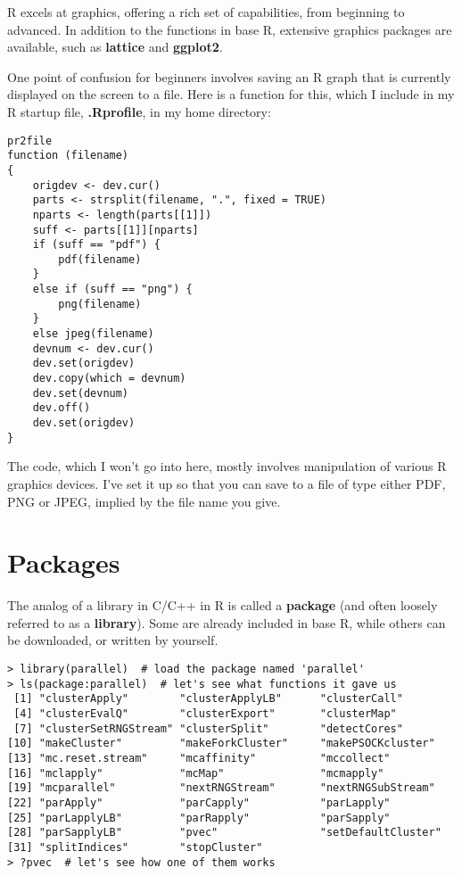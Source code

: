 R excels at graphics, offering a rich set of capabilities, from
beginning to advanced.  In addition to the functions in base R,
extensive graphics packages are available, such as {\bf lattice} and
{\bf ggplot2}.

One point of confusion for beginners involves saving an R graph that
is currently displayed on the screen to a file.  Here is a function for
this, which I include in my R startup file, {\bf .Rprofile}, in my home
directory:

\begin{lstlisting}
pr2file
function (filename) 
{
    origdev <- dev.cur()
    parts <- strsplit(filename, ".", fixed = TRUE)
    nparts <- length(parts[[1]])
    suff <- parts[[1]][nparts]
    if (suff == "pdf") {
        pdf(filename)
    }
    else if (suff == "png") {
        png(filename)
    }
    else jpeg(filename)
    devnum <- dev.cur()
    dev.set(origdev)
    dev.copy(which = devnum)
    dev.set(devnum)
    dev.off()
    dev.set(origdev)
}
\end{lstlisting}

The code, which I won't go into here, mostly involves manipulation of
various R graphics devices.  I've set it up so that you can save to a
file of type either PDF, PNG or JPEG, implied by the file name you give.

\section{Packages}

The analog of a library in C/C++ in R is called a {\bf package} (and
often loosely referred to as a {\bf library}).  Some are already included
in base R, while others can be downloaded, or written by yourself.

\begin{lstlisting}
> library(parallel)  # load the package named 'parallel'
> ls(package:parallel)  # let's see what functions it gave us
 [1] "clusterApply"        "clusterApplyLB"      "clusterCall"        
 [4] "clusterEvalQ"        "clusterExport"       "clusterMap"         
 [7] "clusterSetRNGStream" "clusterSplit"        "detectCores"        
[10] "makeCluster"         "makeForkCluster"     "makePSOCKcluster"   
[13] "mc.reset.stream"     "mcaffinity"          "mccollect"          
[16] "mclapply"            "mcMap"               "mcmapply"           
[19] "mcparallel"          "nextRNGStream"       "nextRNGSubStream"   
[22] "parApply"            "parCapply"           "parLapply"          
[25] "parLapplyLB"         "parRapply"           "parSapply"          
[28] "parSapplyLB"         "pvec"                "setDefaultCluster"  
[31] "splitIndices"        "stopCluster"        
> ?pvec  # let's see how one of them works
\end{lstlisting}

